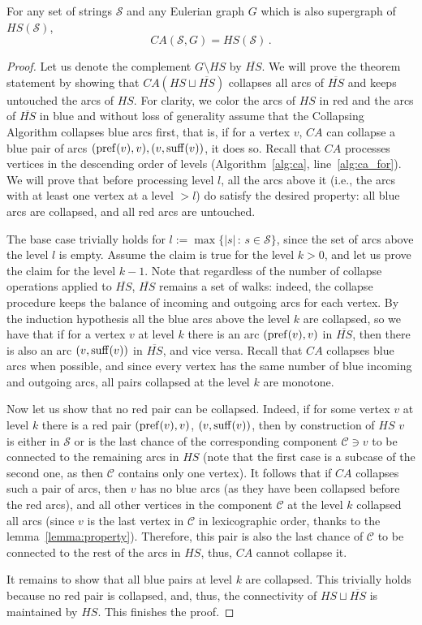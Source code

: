  \begin{theorem}
For any set of strings $\mathcal{S}$ and any Eulerian graph $G$ which is also supergraph of $HS(\mathcal{S})$,
\[
			CA(\mathcal{S}, G) = HS(\mathcal{S}) \, .
\]
\end{theorem}
\begin{proof}
Let us denote the complement $G \setminus HS$ by $\overline{HS}$. We will prove the theorem statement by showing that $CA(HS \sqcup \overline{HS})$ collapses all arcs of $\overline{HS}$ and keeps untouched the arcs of $HS$.  For clarity, we color the arcs of $HS$ in red and the arcs of $\overline{HS}$ in blue and without loss of generality assume that the Collapsing Algorithm collapses blue arcs first, that is, if for a vertex $v$, $CA$ can collapse a blue pair of arcs $(\operatorname{pref}(v), v), (v, \operatorname{suff}(v))$, it does so. Recall that $CA$ processes vertices in the descending order of levels (Algorithm~\ref{alg:ca}, line~\ref{alg:ca_for}). We will prove that before processing level $l$, all the arcs above it (i.e., the arcs with at least one vertex at a level  $>l$) do satisfy the desired property: all blue arcs are collapsed, and all red arcs are untouched.

The base case trivially holds for $l := \max\{|s| \, : \, s\in\mathcal{S}\}$, since the set of arcs above the level $l$ is empty. Assume the claim is true for the level $k > 0$, and let us prove the claim for the level $k - 1$. Note that regardless of the number of collapse operations applied to $\overline{HS}$, $\overline{HS}$ remains a set of walks: indeed, the collapse procedure keeps the balance of incoming and outgoing arcs for each vertex. By the induction hypothesis all the blue arcs above the level $k$ are collapsed, so we have that if for a vertex $v$ at level $k$ there is an arc $(\operatorname{pref}(v), v)$ in $\overline{HS}$, then there is also an arc $(v, \operatorname{suff}(v))$ in $\overline{HS}$, and vice versa. Recall that $CA$ collapses blue arcs when possible, and since every vertex has the same number of blue incoming and outgoing arcs, all pairs collapsed at the level $k$ are monotone. 
	
Now let us show that no red pair can be collapsed. Indeed, if for some vertex $v$ at level $k$ there is a red pair $(\operatorname{pref}(v), v)$, $(v, \operatorname{suff}(v))$, then by construction of $HS$ $v$ is either in $\mathcal{S}$ or is the last chance of the corresponding component $\mathcal{C} \ni v$ to be connected to the remaining arcs in $HS$ (note that the first case is a subcase of the second one, as then $\mathcal{C}$ contains only one vertex). It follows that if $CA$ collapses such a pair of arcs, then $v$ has no blue arcs (as they have been collapsed before the red arcs), and all other vertices in the component $\mathcal{C}$ at the level $k$ collapsed all arcs (since $v$ is the last vertex in $\mathcal{C}$ in lexicographic order, thanks to the lemma~\ref{lemma:property}). Therefore, this pair is also the last chance of $\mathcal{C}$ to be connected to the rest of the arcs in $HS$, thus, $CA$ cannot collapse it.
	
It remains to show that all blue pairs at level $k$ are collapsed. This trivially holds because no red pair is collapsed, and, thus, the connectivity of $HS \sqcup \overline{HS}$ is maintained by $HS$. This finishes the proof.
\end{proof}
